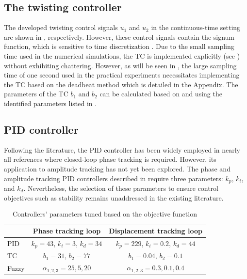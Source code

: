 \documentclass[preprint,12pt]{elsarticle}
\begin{document}
\subsection{The twisting controller} \label{S_designed_TC}

The developed twisting control signals $u_1$ and $u_2$ in the continuous-time setting are shown in , respectively. However, these control signals contain the signum function, which is sensitive to time discretization \cite{MOJALLIZADEH_Franklin}. Due to the small sampling time used in the numerical simulations, the TC is implemented explicitly (see ) without exhibiting chattering. However, as will be seen in , the large sampling time of one second used in the practical experiments necessitates implementing the TC based on the deadbeat method which is detailed in the Appendix. The parameters of the TC $b_1$ and $b_2$ can be calculated based on  and using the identified parameters listed in .

\subsection{PID controller} \label{S_designed_PI}

Following the literature, the PID controller has been widely employed in nearly all references where closed-loop phase tracking is required. However, its application to amplitude tracking has not yet been explored. The phase and amplitude tracking PID controllers described in  require three parameters: $k_p$, $k_i$, and $k_d$. Nevertheless, the selection of these parameters to ensure control objectives such as stability remains unaddressed in the existing literature.

\begin{table}[ht]
    \centering
    \begin{tabular}{|l|c|c|} \hline 
\cellcolor{gray}  & Phase tracking loop  & Displacement tracking loop \\ \hline
PID & $k_p=43$,  $k_i=3$, $k_d=34$  & $k_p=229$,  $k_i=0.2$, $k_d=44$ \\ \hline
TC & $b_1=31$,  $b_2=77$  & $b_1=0.04$,  $b_2=0.1$ \\ \hline
Fuzzy & $\alpha_{1,2,3}=25, 5, 20$  & $\alpha_{1,2,3}=0.3, 0.1, 0.4$  \\  \hline
    \end{tabular}
    \vspace{0.1cm}
    \caption{Controllers' parameters tuned based on the objective function }
    \label{T_parameters}
\end{table}
\end{document}
